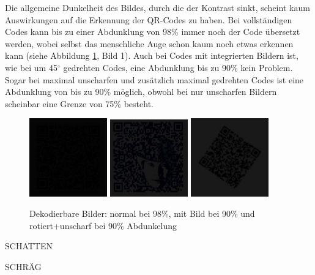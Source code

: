 Die allgemeine Dunkelheit des Bildes, durch die der Kontrast sinkt, scheint kaum Auswirkungen auf die Erkennung der QR-Codes zu haben. Bei vollständigen Codes kann bis zu einer Abdunklung von 98\% immer noch der Code übersetzt werden, wobei selbst das menschliche Auge schon kaum noch etwas erkennen kann (siehe Abbildung \ref*{fig:qrdark}, Bild 1). Auch bei Codes mit integrierten Bildern ist, wie bei um 45$ ^\circ $ gedrehten Codes, eine Abdunklung bis zu 90\% kein Problem. Sogar bei maximal unscharfen und zusätzlich maximal gedrehten Codes ist eine Abdunklung von bis zu 90\% möglich, obwohl bei nur unscharfen Bildern scheinbar eine Grenze von 75\% besteht.
\begin{figure}[H]
  \centering
  \includegraphics[width=0.3\textwidth]{img/QR/dark_03_98.jpg}
  \includegraphics[width=0.3\textwidth]{img/QR/dark_04_90.jpg}
  \includegraphics[width=0.3\textwidth]{img/QR/blurrydarkrotate_03_3_90_35.jpg}
  \caption{Dekodierbare Bilder: normal bei 98\%, mit Bild bei 90\% und rotiert+unscharf bei 90\% Abdunkelung}
  \label{fig:qrdark}
\end{figure}

SCHATTEN

SCHRÄG
